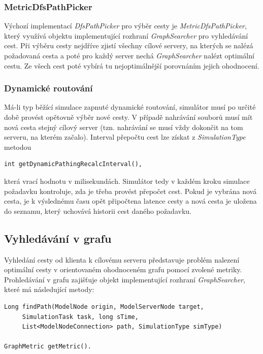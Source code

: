 \documentclass[czech,DP]{thesiskiv}
\begin{document}
\subsubsection*{MetricDfsPathPicker}

Výchozí implementací \textit{DfsPathPicker} pro výběr cesty je \textit{MetricDfsPathPicker}, který využívá objektu implementující rozhraní \textit{GraphSearcher} pro vyhledávání cest. Při výběru cesty nejdříve zjistí všechny cílové servery, na kterých se nalézá požadovaná cesta a poté pro každý server nechá \textit{GraphSearcher} nalézt optimální cestu. Ze všech cest poté vybírá tu nejoptimálnější porovnáním jejich ohodnocení.

\subsubsection*{Dynamické routování}

Má-li typ běžící simulace zapnuté dynamické routování, simulátor musí po určité době provést opětovně výběr nové cesty. V případě nahrávání souborů musí mít nová cesta stejný cílový server (tzn. nahrávání se musí vždy dokončit na tom serveru, na kterém začalo). Interval přepočtu cest lze získat z \textit{SimulationType} metodou

\begin{verbatim}
int getDynamicPathingRecalcInterval(),
\end{verbatim}

\noindent která vrací hodnotu v milisekundách. Simulátor tedy v každém kroku simulace požadavku kontroluje, zda je třeba provést přepočet cest. Pokud je vybrána nová cesta, je k výslednému času opět připočtena latence cesty a nová cesta je uložena do seznamu, který uchovává historii cest daného požadavku.

\subsection{Vyhledávání v grafu}

Vyhledání cesty od klienta k cílovému serveru představuje problém nalezení optimální cesty v orientovaném ohodnoceném grafu pomocí zvolené metriky. Prohledávání v grafu zajišťuje objekt implementující rozhraní \textit{GraphSearcher}, které má následující metody:

\begin{verbatim}
Long findPath(ModelNode origin, ModelServerNode target, 
     SimulationTask task, long sTime, 
     List<ModelNodeConnection> path, SimulationType simType)
     
GraphMetric getMetric().
\end{verbatim}
\end{document}

